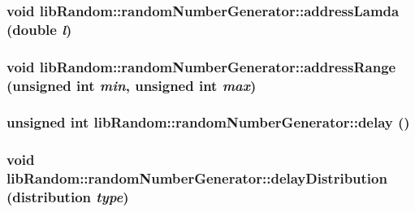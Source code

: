 \begin{CompactItemize}
\hypertarget{classlibRandom_1_1randomNumberGenerator_a14eb74994240473cc7670cf34d2890a}{
\subsubsection[{addressLamda}]{\setlength{\rightskip}{0pt plus 5cm}void libRandom::randomNumberGenerator::addressLamda (double {\em l})}}
\label{classlibRandom_1_1randomNumberGenerator_a14eb74994240473cc7670cf34d2890a}


\hypertarget{classlibRandom_1_1randomNumberGenerator_60fc099a5657350b9b0a176fbea5af33}{
\subsubsection[{addressRange}]{\setlength{\rightskip}{0pt plus 5cm}void libRandom::randomNumberGenerator::addressRange (unsigned int {\em min}, \/  unsigned int {\em max})}}
\label{classlibRandom_1_1randomNumberGenerator_60fc099a5657350b9b0a176fbea5af33}


\hypertarget{classlibRandom_1_1randomNumberGenerator_5bb117331bfebed3e79cc053ea5825f7}{
\subsubsection[{delay}]{\setlength{\rightskip}{0pt plus 5cm}unsigned int libRandom::randomNumberGenerator::delay ()}}
\label{classlibRandom_1_1randomNumberGenerator_5bb117331bfebed3e79cc053ea5825f7}


\hypertarget{classlibRandom_1_1randomNumberGenerator_80d640f561800b1a4676c5e3324b180a}{
\subsubsection[{delayDistribution}]{\setlength{\rightskip}{0pt plus 5cm}void libRandom::randomNumberGenerator::delayDistribution ({\bf distribution} {\em type})}}
\label{classlibRandom_1_1randomNumberGenerator_80d640f561800b1a4676c5e3324b180a}



\end{CompactItemize}
